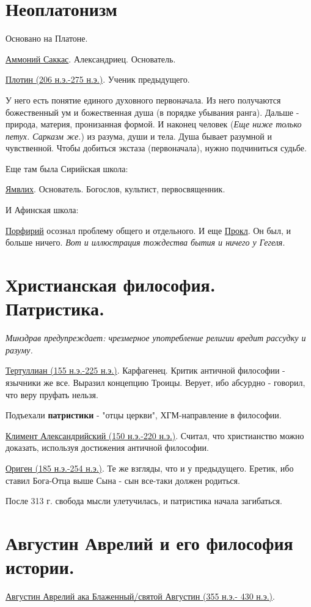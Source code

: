 \section{Неоплатонизм}

Основано на Платоне.

\underline{Аммоний Саккас}. Александриец. Основатель.

\underline{Плотин (206 н.э.-275 н.э.)}. Ученик предыдущего. 

У него есть понятие единого духовного первоначала. Из него получаются божественный ум и божественная душа (в порядке убывания ранга).  Дальше - природа, материя, пронизанная формой. И наконец человек (\textit{Еще ниже только петух. Сарказм же.}) из разума, души и тела. Душа бывает разумной и чувственной. Чтобы добиться экстаза (первоначала), нужно подчиниться судьбе.

Еще там была Сирийская школа:

\underline{Ямвлих}. Основатель. Богослов, культист, первосвященник. 

И Афинская школа:

\underline{Порфирий} осознал проблему общего и отдельного. И еще \underline{Прокл}. Он был, и больше ничего. \textit{Вот и иллюстрация тождества бытия и ничего у Гегеля}.


\section{Христианская философия. Патристика.}
\textit{Минздрав предупреждает: чрезмерное употребление религии вредит рассудку и разуму.}

\underline{Тертуллиан (155 н.э.-225 н.э.)}. Карфагенец. Критик античной философии - язычники же все. Выразил концепцию Троицы. Верует, ибо абсурдно - говорил, что веру пруфать нельзя. 

Подъехали \textbf{патристики} - "отцы церкви", ХГМ-направление в философии.

\underline{Климент Александрийский (150 н.э.-220 н.э.)}. Считал, что христианство можно доказать, используя достижения античной философии.

\underline{Ориген (185 н.э.-254 н.э.)}. Те же взгляды, что и у предыдущего. Еретик, ибо ставил Бога-Отца выше Сына - сын все-таки должен родиться.
 
После 313 г. свобода мысли улетучилась, и патристика начала загибаться.

\section{Августин Аврелий и его философия истории.}
\hspace{8pt} 
\underline{Августин Аврелий ака Блаженный/святой Августин (355 н.э.- 430 н.э.)}. 

